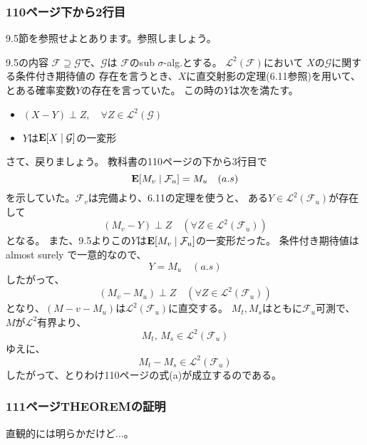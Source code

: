     \subsubsection{110ページ下から2行目}
      9.5節を参照せよとあります。参照しましょう。
      \begin{itembox}[l]{9.5の内容}
        $\mathcal{F} \supseteq \mathcal{G}$で、$\mathcal{G}$は
        $\mathcal{F}$のsub $\sigma$-alg.とする。
        $\mathcal{L}^2(\mathcal{F})$において
        $X$の$\mathcal{G}$に関する条件付き期待値の
        存在を言うとき、$X$に直交射影の定理(6.11参照)を用いて、
        とある確率変数$Y$の存在を言っていた。
        この時の$Y$は次を満たす。
        \begin{itemize}
          \item $(X - Y) \perp Z , \quad \forall Z \in \mathcal{L}^2(\mathcal{G})$
          \item $Y$は${\mathbf{E}}[X \mid \mathcal{G}]$の一変形
        \end{itemize}
      \end{itembox}
      さて、戻りましょう。
      教科書の110ページの下から3行目で
      \[
        {\mathbf{E}}[M_v \mid \mathcal{F}_u] = M_u \quad (a.s)
      \]
      を示していた。$\mathcal{F}_v$は完備より、6.11の定理を使うと、
      ある$Y \in \mathcal{L}^2(\mathcal{F}_u)$が存在して
      \[(M_v - Y) \perp Z \quad (\forall Z \in \mathcal{L}^2(\mathcal{F}_u))\]
      となる。
      また、9.5よりこの$Y$は${\mathbf{E}}[M_v \mid \mathcal{F}_u]$の一変形だった。
      条件付き期待値はalmost surely で一意的なので、
      \[
        Y = M_u \quad (a.s)
      \]
      したがって、
      \[
        (M_v - M_u) \perp Z \quad (\forall Z \in \mathcal{L}^2(\mathcal{F}_u))
      \]
      となり、$(M-v -M_u)$は$\mathcal{L}^2(\mathcal{F}_u)$に直交する。
      $M_t, M_s$はともに$\mathcal{F}_u$可測で、
      $M$が$\mathcal{L}^2$有界より、
      \[
        M_t, \, M_s \in \mathcal{L}^2(\mathcal{F}_u)
      \]
      ゆえに、
      \[
        M_t - M_s \in \mathcal{L}^2(\mathcal{F}_u)
      \]
      したがって、とりわけ110ページの式(a)が成立するのである。

    \subsubsection{111ページTHEOREMの証明}
      直観的には明らかだけど...。

